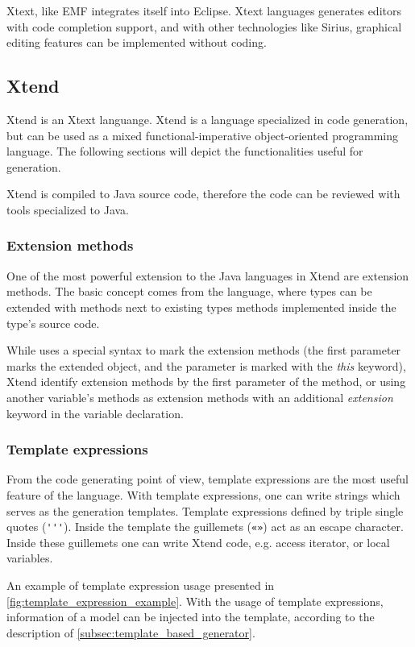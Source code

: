 Xtext, like EMF integrates itself into Eclipse. Xtext languages generates editors with code completion support, and with other technologies like Sirius, graphical editing features can be implemented without coding.

\subsection{Xtend}

Xtend is an Xtext languange. Xtend is a language specialized in \mtt code generation, but can be used as a mixed functional-imperative object-oriented programming language. The following sections will depict the functionalities useful for \mtt generation.

Xtend is compiled to Java source code, therefore the code can be reviewed with tools specialized to Java.

\subsubsection{Extension methods}

One of the most powerful extension to the Java languages in Xtend are extension methods. The basic concept comes from the  language, where types can be extended with methods next to existing types methods implemented inside the type's source code.

While  uses a special syntax to mark the extension methods (the first parameter marks the extended object, and the parameter is marked with the \emph{this} keyword), Xtend identify extension methods by the first parameter of the method, or using another variable's methods as extension methods with an additional \emph{extension} keyword in the variable declaration.

\subsubsection{Template expressions}

From the code generating point of view, template expressions are the most useful feature of the language. With template expressions, one can write strings which serves as the generation templates. Template expressions defined by triple single quotes (\verb+'''+). Inside the template the guillemets (\verb+«»+) act as an escape character. Inside these guillemets one can write Xtend code, e.g. access iterator, or local variables.

An example of template expression usage presented in \cref{fig:template_expression_example}. With the usage of template expressions, information of a model can be injected into the template, according to the description of \cref{subsec:template_based_generator}.

